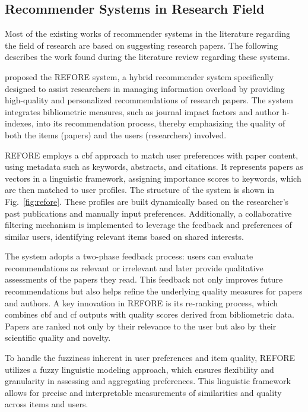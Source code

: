 \subsection*{Recommender Systems in Research Field}\label{sec:recommender-systems-in-research-field}
Most of the existing works of recommender systems in the literature regarding the field of research are based on suggesting research papers.
The following describes the work found during the literature review regarding these systems.

\textcite{refore} proposed the REFORE system, a hybrid recommender system specifically designed to assist researchers in managing information overload by providing high-quality and personalized recommendations of research papers.
The system integrates bibliometric measures, such as journal impact factors and author h-indexes, into its recommendation process, thereby emphasizing the quality of both the items (papers) and the users (researchers) involved.

REFORE employs a \gls{cbf} approach to match user preferences with paper content, using metadata such as keywords, abstracts, and citations.
It represents papers as vectors in a linguistic framework, assigning importance scores to keywords, which are then matched to user profiles.
The structure of the system is shown in Fig.~\ref{fig:refore}.
These profiles are built dynamically based on the researcher's past publications and manually input preferences.
Additionally, a collaborative filtering mechanism is implemented to leverage the feedback and preferences of similar users, identifying relevant items based on shared interests.

The system adopts a two-phase feedback process: users can evaluate recommendations as relevant or irrelevant and later provide qualitative assessments of the papers they read.
This feedback not only improves future recommendations but also helps refine the underlying quality measures for papers and authors.
A key innovation in REFORE is its re-ranking process, which combines \gls{cbf} and \gls{cf} outputs with quality scores derived from bibliometric data.
Papers are ranked not only by their relevance to the user but also by their scientific quality and novelty.

To handle the fuzziness inherent in user preferences and item quality, REFORE utilizes a fuzzy linguistic modeling approach, which ensures flexibility and granularity in assessing and aggregating preferences.
This linguistic framework allows for precise and interpretable measurements of similarities and quality across items and users.

